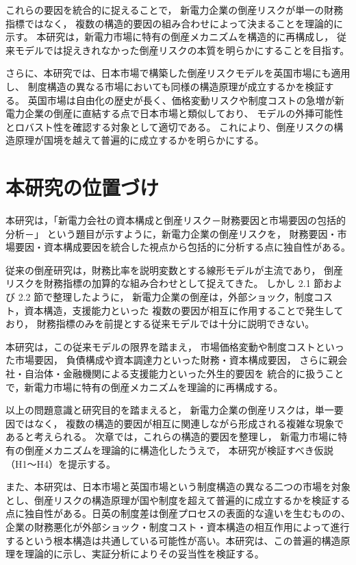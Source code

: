 これらの要因を統合的に捉えることで，
新電力企業の倒産リスクが単一の財務指標ではなく，
複数の構造的要因の組み合わせによって決まることを理論的に示す。
本研究は，新電力市場に特有の倒産メカニズムを構造的に再構成し，
従来モデルでは捉えきれなかった倒産リスクの本質を明らかにすることを目指す。

さらに、本研究では、日本市場で構築した倒産リスクモデルを英国市場にも適用し、
制度構造の異なる市場においても同様の構造原理が成立するかを検証する。
英国市場は自由化の歴史が長く、価格変動リスクや制度コストの急増が新電力企業の倒産に直結する点で日本市場と類似しており、
モデルの外挿可能性とロバスト性を確認する対象として適切である。
これにより、倒産リスクの構造原理が国境を越えて普遍的に成立するかを明らかにする。



\section{本研究の位置づけ}

本研究は，「新電力会社の資本構成と倒産リスク－財務要因と市場要因の包括的分析－」
という題目が示すように，新電力企業の倒産リスクを，
財務要因・市場要因・資本構成要因を統合した視点から包括的に分析する点に独自性がある。

従来の倒産研究は，財務比率を説明変数とする線形モデルが主流であり，
倒産リスクを財務指標の加算的な組み合わせとして捉えてきた。
しかし 2.1 節および 2.2 節で整理したように，
新電力企業の倒産は，外部ショック，制度コスト，資本構造，支援能力といった
複数の要因が相互に作用することで発生しており，
財務指標のみを前提とする従来モデルでは十分に説明できない。

本研究は，この従来モデルの限界を踏まえ，
市場価格変動や制度コストといった市場要因，
負債構成や資本調達力といった財務・資本構成要因，
さらに親会社・自治体・金融機関による支援能力といった外生的要因を
統合的に扱うことで，新電力市場に特有の倒産メカニズムを理論的に再構成する。

以上の問題意識と研究目的を踏まえると，
新電力企業の倒産リスクは，単一要因ではなく，
複数の構造的要因が相互に関連しながら形成される複雑な現象であると考えられる。
次章では，これらの構造的要因を整理し，
新電力市場に特有の倒産メカニズムを理論的に構造化したうえで，
本研究が検証すべき仮説（H1〜H4）を提示する。

また、本研究は、日本市場と英国市場という制度構造の異なる二つの市場を対象とし、倒産リスクの構造原理が国や制度を超えて普遍的に成立するかを検証する点に独自性がある。日英の制度差は倒産プロセスの表面的な違いを生むものの、企業の財務悪化が外部ショック・制度コスト・資本構造の相互作用によって進行するという根本構造は共通している可能性が高い。本研究は、この普遍的構造原理を理論的に示し、実証分析によりその妥当性を検証する。
